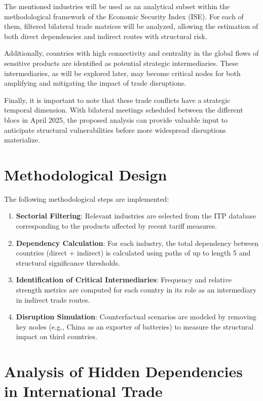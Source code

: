 \documentclass[final,1p,times,authoryear]{elsarticle}
\begin{document}
The mentioned industries will be used as an analytical subset within the methodological framework of the Economic Security Index (ISE). For each of them, filtered bilateral trade matrices will be analyzed, allowing the estimation of both direct dependencies and indirect routes with structural risk.

Additionally, countries with high connectivity and centrality in the global flows of sensitive products are identified as potential strategic intermediaries. These intermediaries, as will be explored later, may become critical nodes for both amplifying and mitigating the impact of trade disruptions.

Finally, it is important to note that these trade conflicts have a strategic temporal dimension. With bilateral meetings scheduled between the different blocs in April 2025, the proposed analysis can provide valuable input to anticipate structural vulnerabilities before more widespread disruptions materialize.

\section{Methodological Design}

The following methodological steps are implemented:

\begin{enumerate}
    \item \textbf{Sectorial Filtering}: Relevant industries are selected from the ITP database corresponding to the products affected by recent tariff measures.
    \item \textbf{Dependency Calculation}: For each industry, the total dependency between countries (direct + indirect) is calculated using paths of up to length 5 and structural significance thresholds.
    \item \textbf{Identification of Critical Intermediaries}: Frequency and relative strength metrics are computed for each country in its role as an intermediary in indirect trade routes.
    \item \textbf{Disruption Simulation}: Counterfactual scenarios are modeled by removing key nodes (e.g., China as an exporter of batteries) to measure the structural impact on third countries.
\end{enumerate}

\section{Analysis of Hidden Dependencies in International Trade}
\end{document}

